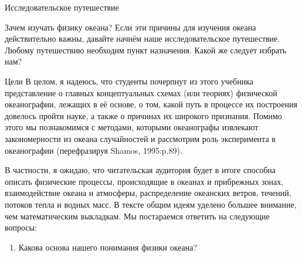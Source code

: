 \begin{chapter}{Исследовательское путешествие}
\begin{section}{Зачем изучать физику океана?}
Если эти причины для изучения океана действительно важны, давайте начнём 
наше исследовательское путешествие. Любому путешествию необходим пункт 
назначения. Какой же следует избрать нам?
%
\end{section}

\begin{section}{Цели}
В целом, я надеюсь, что студенты почерпнут из этого учебника
представление о главных концептуальных схемах (или теориях) физической 
океанографии, лежащих в её основе, о том, какой путь в процессе их построения 
довелось пройти науке, а также о причинах их широкого признания. Помимо этого 
мы познакомимся с методами, которыми океанографы извлекают закономерности из
океана случайностей и рассмотрим роль эксперимента в океанографии
(перефразируя Shamos, 1995:p.89).
%

В частности, я ожидаю, что читательская аудитория будет в итоге способна 
описать физические процессы, происходящие в океанах и прибрежных зонах, 
взаимодействие океана и атмосферы, распределение океанских ветров, течений, 
потоков тепла и водных масс. В тексте общим идеям уделено большее внимание, 
чем математическим выкладкам. Мы постараемся ответить на следующие вопросы:
%

\begin{enumerate}
\item
Какова основа нашего понимания физики океана?
%


\end{enumerate}
\end{section}
\end{chapter}
